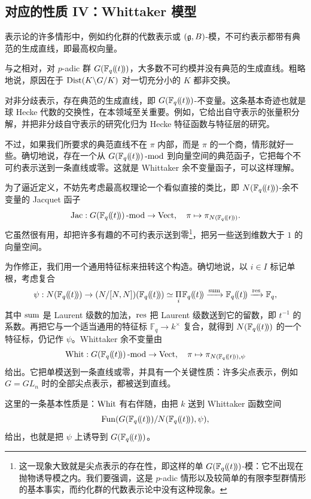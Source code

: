 \subsection{对应的性质 IV：Whittaker 模型}

\ssszh 表示论的许多情形中，例如约化群的代数表示或 $(\mathfrak{g},B)$-模，不可约表示都带有\nobreak 典范的生成直线，即最高权向量。

与之相对，对 $p$-adic 群 $G(\mathbb{F}_q(\!(t)\!))$，大多数不可约模并没有典范的生成直线。粗略地说，原因在于 $\operatorname{Dist}(K\backslash G/K)$ 对一切充分小的 $K$ 都非交换。

\begin{re} 对非分歧表示，存在典范的生成直线，即 $G(\mathbb{F}_q(\!(t)\!))$-不变量。这条基本奇迹也就是球 Hecke 代数的交换性，在本领域至关重要。例如，它给出自守表示的张量积分解，并把非分歧自守表示的研究化归为 Hecke 特征函数与特征层的研究。\end{re}

不过，如果我们所要求的典范直线不在 $\pi$ 内部，而是 $\pi$ 的一个商，情形就好一些。确切地说，存在一个从 $G(\mathbb{F}_q(\!(t)\!))\operatorname{-mod}$ 到向量空间的典范函子，它把每个不可约表示送到一条直线或零。这就是 Whittaker 余不变量函子，可以这样理解。

为了逼近定义，不妨先考虑最高权理论一个看似直接的类比，即 $N(\mathbb{F}_q(\!(t)\!))$-余不变量的 Jacquet 函子
\[
\operatorname{Jac}: G(\mathbb{F}_q(\!(t)\!))\operatorname{-mod} \rightarrow \operatorname{Vect}, \quad \pi \mapsto
\pi_{N(\mathbb{F}_q(\!(t)\!))}.
\]
它虽然很有用，却把许多有趣的不可约表示送到零\footnote{这一现象大致就是尖点表示的存在性，即这样的单 $G(\mathbb{F}_q(\!(t)\!))$-模：它不出现在抛物诱导模之内。我们要强调，这是 $p$-adic 情形以及较简单的有限李型群情形的基本事实，而约化群的代数表示论中没有这种现象。}，把另一些送到维数大于 $1$ 的向量空间。

为作修正，我们用一个通用特征标来扭转这个构造。确切地说，以 $i \in I$ 标记单根，考虑复合
\begin{equation} \label{e:whitchar}
\psi:  N(\Fqt) \rightarrow (N/[N,N])(\Fqt) \simeq \underset{i} \Pi
\hspace{.2mm}
\Fqt \xrightarrow{\on{sum}} \Fqt
\xrightarrow{\on{res}} \Fq,
\end{equation}
其中 $\operatorname{sum}$ 是 Laurent 级数的加法，$\operatorname{res}$ 把 Laurent 级数送到它的留数，即 $t^{-1}$ 的系数。再把它与一个适当通用的特征标 $\mathbb{F}_q \rightarrow k^\times$ 复合，就得到 $N(\mathbb{F}_q(\!(t)\!))$ 的一个特征标，仍记作 $\psi$。Whittaker 余不变量由
\[
\operatorname{Whit}: G(\mathbb{F}_q(\!(t)\!))\operatorname{-mod} \rightarrow \operatorname{Vect}, \quad \pi \mapsto \pi_{N(\mathbb{F}_q(\!(t)\!)),
\psi}
\]
给出。它把单模送到一条直线或零，并具有一个关键性质：许多尖点表示，例如 $G = GL_n$ 时的全部尖点表示，都被送到直线。

这里的一条基本性质是：$\operatorname{Whit}$ 有右伴随，由把 $k$ 送到 Whittaker 函数空间
\[
\operatorname{Fun}( G(\mathbb{F}_q(\!(t)\!)) / N(\mathbb{F}_q(\!(t)\!)), \psi),
\]
给出，也就是把 $\psi$ 上诱导到 $G(\mathbb{F}_q(\!(t)\!))$。

